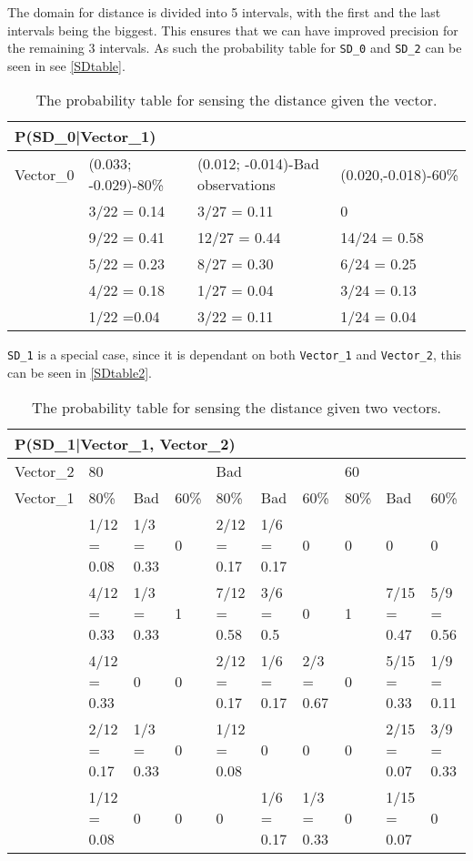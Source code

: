 The domain for distance is divided into 5 intervals, with the first and the last
intervals being the biggest. This ensures that we can have improved precision
for the remaining 3 intervals. As such the probability table for \texttt{SD\_0}
and \texttt{SD\_2} can be seen in see \autoref{SDtable}.

\begin{center}
\begin{table}[H]
\begin{tabular}{|l|l|l|l|}
\hline
\multicolumn{4}{|l|}{P(SD\_0|Vector\_1)} \\ \hline
Vector\_0     & (0.033; -0.029)-80\% & (0.012; -0.014)-Bad observations &
(0.020,-0.018)-60\% \\\hline 
[0 - 60]      & 3/22 = 0.14 & 3/27 = 0.11 & 0 \\ \hline 
[60 - 75]    & 9/22 = 0.41 & 12/27 = 0.44 & 14/24 = 0.58 \\ \hline
[75 - 90]   & 5/22 = 0.23 & 8/27 = 0.30 & 6/24 = 0.25 \\ \hline
[90 - 105]   & 4/22 = 0.18 & 1/27 = 0.04 & 3/24 = 0.13 \\ \hline
[105 - 255]   & 1/22 =0.04 & 3/22 = 0.11 & 1/24 = 0.04   \\ \hline
\end{tabular}
\caption{The probability table for sensing the distance given the vector.}
\label{SDtable}
\end{table}
\end{center}

\texttt{SD\_1} is a special case, since it is dependant on
both \texttt{Vector\_1} and \texttt{Vector\_2}, this can be seen in
\autoref{SDtable2}.

\begin{table}[H]
\centering
\begin{tabular}{|l|l|l|l|l|l|l|l|l|l|}
\hline
\multicolumn{10}{|l|}{P(SD\_1|Vector\_1, Vector\_2)} \\\hline 
Vector\_2 & \multicolumn{3}{l|}{80} & \multicolumn{3}{l|}{Bad} &
\multicolumn{3}{l|}{60}\\\hline 
Vector\_1 & 80\%      &  Bad     & 60\%      & 80\%      & Bad      & 60\%     
& 80\% & Bad & 60\% \\\hline
[0-60]&1/12 = 0.08 & 1/3 = 0.33 & 0      & 2/12 = 0.17 & 1/6 = 0.17 & 0 & 0  
& 0 & 0 \\ \hline
[60-75]&4/12 = 0.33 & 1/3 = 0.33 & 1      & 7/12 = 0.58 & 3/6 = 0.5 & 0      & 1     
& 7/15 = 0.47 & 5/9 = 0.56\\ \hline
[75-90] & 4/12 = 0.33 & 0 & 0 & 2/12 = 0.17 & 1/6 = 0.17 & 2/3 = 0.67 & 0 
& 5/15 = 0.33 &1/9 = 0.11\\\hline
[90-105] & 2/12 = 0.17 & 1/3 = 0.33 & 0 & 1/12 = 0.08 & 0 & 0 & 0 
& 2/15 = 0.07  & 3/9 = 0.33\\\hline
[105-255] & 1/12 = 0.08 & 0 & 0 & 0 & 1/6 = 0.17 & 1/3 = 0.33 & 0 & 1/15 = 0.07     
&0\\\hline
\end{tabular}
\caption{The probability table for sensing the distance given two vectors.}
\label{SDtable2}
\end{table}

